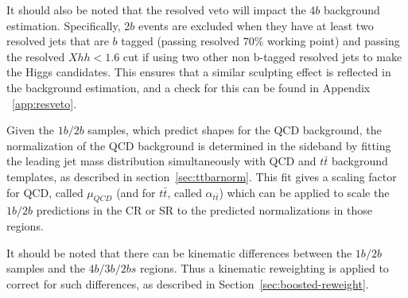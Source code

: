 \label{par:boosted-qcd-2bseperate}

It should also be noted that the resolved veto will impact the 4$b$ background estimation.  Specifically, 2$b$ events are excluded when they have at least two resolved jets that are $b$ tagged (passing resolved $70\%$ working point) and passing the resolved $Xhh < 1.6$ cut if using two other non b-tagged resolved jets to make the Higgs candidates. This ensures that a similar sculpting effect is reflected in the background estimation, and a check for this can be found in Appendix ~\ref{app:resveto}.

Given the $1b/2b$ samples, which predict shapes for the QCD background, the normalization of the QCD background is determined in the sideband by fitting the leading jet mass distribution simultaneously with QCD and $t\bar{t}$ background templates, as described in section~\ref{sec:ttbarnorm}.  This fit gives a scaling factor for QCD, called $\mu_{QCD}$ (and for $t\bar{t}$, called $\alpha_{t\bar{t}}$) which can be applied to scale the $1b/2b$ predictions in the CR or SR to the predicted normalizations in those regions.

It should be noted that there can be kinematic differences between the  $1b/2b$ samples and the $4b/3b/2bs$ regions.  Thus a kinematic reweighting is applied to correct for such differences, as described in Section~\ref{sec:boosted-reweight}.






